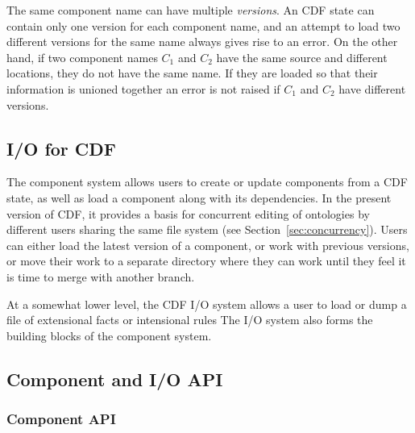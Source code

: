 The same component name can have multiple {\em versions}.  An CDF
state can contain only one version for each component name, and an
attempt to load two different versions for the same name always gives
rise to an error.  On the other hand, if two component names $C_1$ and
$C_2$ have the same source and different locations, they do not have
the same name.  If they are loaded so that their information is
unioned together an error is not raised if $C_1$ and $C_2$ have
different versions.

\subsection{I/O for CDF}

The component system allows users to create or update components from
a CDF state, as well as load a component along with its dependencies.
In the present version of CDF, it provides a basis for concurrent
editing of ontologies by different users sharing the same file system
(see Section~\ref{sec:concurrency}).  Users can either load the latest
version of a component, or work with previous versions, or move their
work to a separate directory where they can work until they feel it is
time to merge with another branch. 

At a somewhat lower level, the CDF I/O system allows a user to load or
dump a file of extensional facts or intensional rules  The I/O system
also forms the building blocks of the component system.


\subsection{Component and I/O API}

\subsubsection{Component API}

